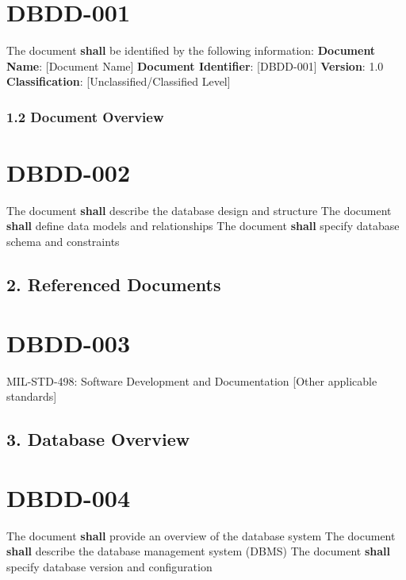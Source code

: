 \section{DBDD-001}\label{DBDD-001}

The document \textbf{shall} be identified by the following information:
\textbf{Document Name}: [Document Name]
\textbf{Document Identifier}: [DBDD-001]
\textbf{Version}: 1.0
\textbf{Classification}: [Unclassified/Classified Level]

\subsubsection{1.2 Document Overview}

\section{DBDD-002}\label{DBDD-002}

The document \textbf{shall} describe the database design and structure
The document \textbf{shall} define data models and relationships
The document \textbf{shall} specify database schema and constraints

\subsection{2. Referenced Documents}

\section{DBDD-003}\label{DBDD-003}

MIL-STD-498: Software Development and Documentation
[Other applicable standards]\\

\subsection{3. Database Overview}

\section{DBDD-004}\label{DBDD-004}

The document \textbf{shall} provide an overview of the database system
The document \textbf{shall} describe the database management system (DBMS)
The document \textbf{shall} specify database version and configuration

